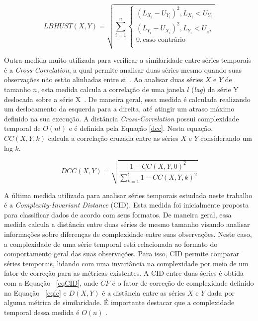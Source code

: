 \begin{equation}\label{hus}
LBHUST(X,Y)= \sqrt{ \sum_{i=1}^{n} 
  \begin{cases}
      (L_{X_{i}}- U_{Y_{i}})^2,  L_{X_{i}}< U_{Y_{i} }   \\
   (L_{Y_{i}}- U_{X_{i}})^2,  L_{Y_{i}}< U_{_X{i} }  \\
    0, \textrm{caso contrário} \\
  \end{cases}}
\end{equation}

Outra medida muito utilizada para verificar a similaridade entre séries temporais é a \textit{Cross-Correlation}, a qual permite analisar duas séries mesmo quando suas observações não estão alinhadas entre si~\cite{Liao2005,cross}. Ao analisar duas séries $X$ e $Y$ de tamanho $n$, esta medida calcula a correlação de uma janela $l$ (\emph{lag}) da série Y deslocada sobre a série X~\cite{Liao2005,cross}. De maneira geral, essa medida é calculada realizando um deslocamento da esquerda para a direita, até atingir um atraso máximo definido na sua execução. A distância \textit{Cross-Correlation} possui complexidade temporal de $O(nl)$ e é definida pela Equação \ref{dcc}. Nesta equação, $CC(X, Y, k)$ calcula a correlação cruzada entre as séries $X$ e $Y$ considerando um lag $k$.

\begin{equation}\label{dcc}
DCC(X,Y)= \sqrt{\frac{1 - CC(X, Y, 0)^2}{\sum_{k=1}^{l}1 - CC(X, Y, k)^2}}
\end{equation}

A última medida utilizada para analisar séries temporais estudada neste trabalho é a \textit{Complexity-Invariant Distance} (CID). Esta medida foi inicialmente proposta para classificar dados de acordo com seus formatos. De maneira geral, essa medida calcula a distância entre duas séries de mesmo tamanho visando analisar informações sobre diferenças de complexidade entre suas observações. Neste caso, a complexidade de uma série temporal está relacionada ao formato do comportamento geral das suas observações. Para isso, CID permite comparar séries temporais, lidando com uma invariância na complexidade por meio de um fator de correção para as métricas existentes. A CID entre duas śeries é obtida com a Equação ~\ref{eqCID}, onde $CF$ é o fator de correção de complexidade definido na Equação ~\ref{eqfc} e $D(X,Y)$ é a distância entre as séries $X$ e $Y$ dada por alguma métrica de similaridade. É importante destacar que a complexidade temporal dessa medida é $O(n)$ \cite{Batista2014}. 

